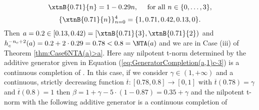 \begin{example}
\begin{itemize}
\begin{itemize}
			$$\xtnB{0.71}{n}=1-0.29n, \quad \text{ for all } n \in \{0,\dots,3\},$$
			$$\{\xtnB{0.71}{n}\}_{n=0}^4 = \{1,0.71,0.42,0.13,0\}.$$
			Then  $a=0.2 \in [0.13,0.42) = [\xtnB{0.71}{3},\xtnB{0.71}{2})$ and $h_c^{-n_c+2}(a)=0.2+2\cdot 0.29 = 0.78 < 0.8 = \NTA(a)$ and we are in Case (iii) of Theorem \ref{thm:Case6NTA(a)>a}. Here any nilpotent t-norm determined by the additive generator given in Equation (\ref{eq:GeneratorCompletion(a,1)c-3}) is a continuous completion of \TB. In this case, if we consider $\gamma \in (1,+\infty)$ and  a continuous, strictly decreasing function $\overline{t}:[0.78,0.8] \to [0,1]$ with $\overline{t}(0.78) = \gamma$ and $\overline{t}(0.8)=1$ then $\beta= 1 + \gamma - 5\cdot(1-0.87)=0.35 + \gamma$ and the nilpotent t-norm with the following additive generator is a continuous completion of \TB
			

\end{itemize}
\end{itemize}
\end{example}
